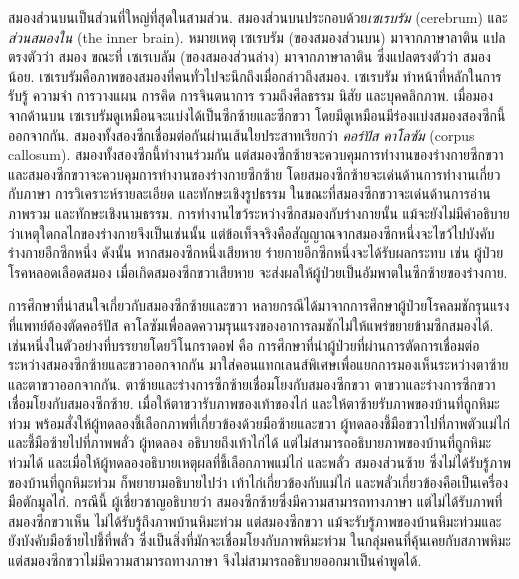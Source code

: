 {\begin{shaded}
สมองส่วนบนเป็นส่วนที่ใหญ่ที่สุดในสามส่วน.
สมองส่วนบนประกอบด้วย\textit{เซเรบรัม} (cerebrum) และ\textit{ส่วนสมองใน} (the inner brain).
หมายเหตุ เซเรบรัม (ของสมองส่วนบน) มาจากภาษาลาติน แปลตรงตัวว่า สมอง
ขณะที่ เซเรเบลัม (ของสมองส่วนล่าง) มาจากภาษาลาติน ซึ่งแปลตรงตัวว่า สมองน้อย.
เซเรบรัมคือภาพของสมองที่คนทั่วไปจะนึกถึงเมื่อกล่าวถึงสมอง.
เซเรบรัม ทำหน้าที่หลักในการรับรู้ ความจำ การวางแผน การคิด การจินตนาการ รวมถึงศีลธรรม นิสัย และบุคคลิกภาพ.
เมื่อมองจากด้านบน เซเรบรัมดูเหมือนจะแบ่งได้เป็นซีกซ้ายและซีกขวา โดยมีดูเหมือนมีร่องแบ่งสมองสองซีกนี้ออกจากกัน.
สมองทั้งสองซีกเชื่อมต่อกันผ่านเส้นใยประสาทเรียกว่า \textit{คอร์ปัส คาโลซัม} (corpus callosum).
สมองทั้งสองซีกนี้ทำงานร่วมกัน แต่สมองซีกซ้ายจะควบคุมการทำงานของร่างกายซีกขวา และสมองซีกขวาจะควบคุมการทำงานของร่างกายซีกซ้าย
โดยสมองซีกซ้ายจะเด่นด้านการทำงานเกี่ยวกับภาษา การวิเคราะห์รายละเอียด และทักษะเชิงรูปธรรม
ในขณะที่สมองซีกขวาจะเด่นด้านการอ่านภาพรวม และทักษะเชิงนามธรรม.
การทำงานไขว้ระหว่างซีกสมองกับร่างกายนั้น แม้จะยังไม่มีคำอธิบายว่าเหตุใดกลไกของร่างกายจึงเป็นเช่นนั้น
แต่ข้อเท็จจริงคือสัญญาณจากสมองซีกหนึ่งจะไขว้ไปบังคับร่างกายอีกซีกหนึ่ง
ดังนั้น หากสมองซีกหนึ่งเสียหาย ร่ายกายอีกซีกหนึ่งจะได้รับผลกระทบ
เช่น 
ผู้ป่วยโรคหลอดเลือดสมอง เมื่อเกิดสมองซีกขวาเสียหาย จะส่งผลให้ผู้ป่วยเป็นอัมพาตในซีกซ้ายของร่างกาย.

การศึกษาที่น่าสนใจเกี่ยวกับสมองซีกซ้ายและขวา หลายกรณีได้มาจากการศึกษาผู้ป่วยโรคลมชักรุนแรง ที่แพทย์ต้องตัดคอร์ปัส คาโลซัมเพื่อลดความรุนแรงของอาการลมชักไม่ให้แพร่ขยายข้ามซีกสมองได้.
เช่นหนึ่งในตัวอย่างที่บรรยายโดยวีโนกราดอฟ\cite{Vinogradov2007a}
คือ การศึกษาที่นำผู้ป่วยที่ผ่านการตัดการเชื่อมต่อระหว่างสมองซีกซ้ายและขวาออกจากกัน มาใส่คอนแทกเลนส์พิเศษเพื่อแยกการมองเห็นระหว่างตาซ้ายและตาขวาออกจากกัน.
ตาซ้ายและร่างการซีกซ้ายเชื่อมโยงกับสมองซีกขวา
ตาขวาและร่างการซีกขวาเชื่อมโยงกับสมองซีกซ้าย.
เมื่อให้ตาขวารับภาพของเท้าของไก่
และให้ตาซ้ายรับภาพของบ้านที่ถูกหิมะท่วม
พร้อมสั่งให้ผู้ทดลองชี้เลือกภาพที่เกี่ยวข้องด้วยมือซ้ายและขวา
ผู้ทดลองชี้มือขวาไปที่ภาพตัวแม่ไก่
และชี้มือซ้ายไปที่ภาพพลั่ว
ผู้ทดลอง อธิบายถึงเท้าไก่ได้ แต่ไม่สามารถอธิบายภาพของบ้านที่ถูกหิมะท่วมได้
และเมื่อให้ผู้ทดลองอธิบายเหตุผลที่ชี้เลือกภาพแม่ไก่ และพลั่ว
สมองส่วนซ้าย ซึ่งไม่ได้รับรู้ภาพของบ้านที่ถูกหิมะท่วม ก็พยายามอธิบายไปว่า เท้าไก่เกี่ยวข้องกับแม่ไก่ 
และพลั่วเกี่ยวข้องคือเป็นเครื่องมือตักมูลไก่.
กรณีนี้ ผู้เชี่ยวชาญอธิบายว่า สมองซีกซ้ายซึ่งมีความสามารถทางภาษา แต่ไม่ได้รับภาพที่สมองซีกขวาเห็น ไม่ได้รับรู้ถึงภาพบ้านหิมะท่วม
แต่สมองซีกขวา แม้จะรับรู้ภาพของบ้านหิมะท่วมและยังบังคับมือซ้ายไปชี้ที่พลั่ว 
ซึ่งเป็นสิ่งที่มักจะเชื่อมโยงกับภาพหิมะท่วม ในกลุ่มคนที่คุ้นเคยกับสภาพหิมะ 
แต่สมองซีกขวาไม่มีความสามารถทางภาษา จึงไม่สามารถอธิบายออกมาเป็นคำพูดได้.


\end{shaded}}

